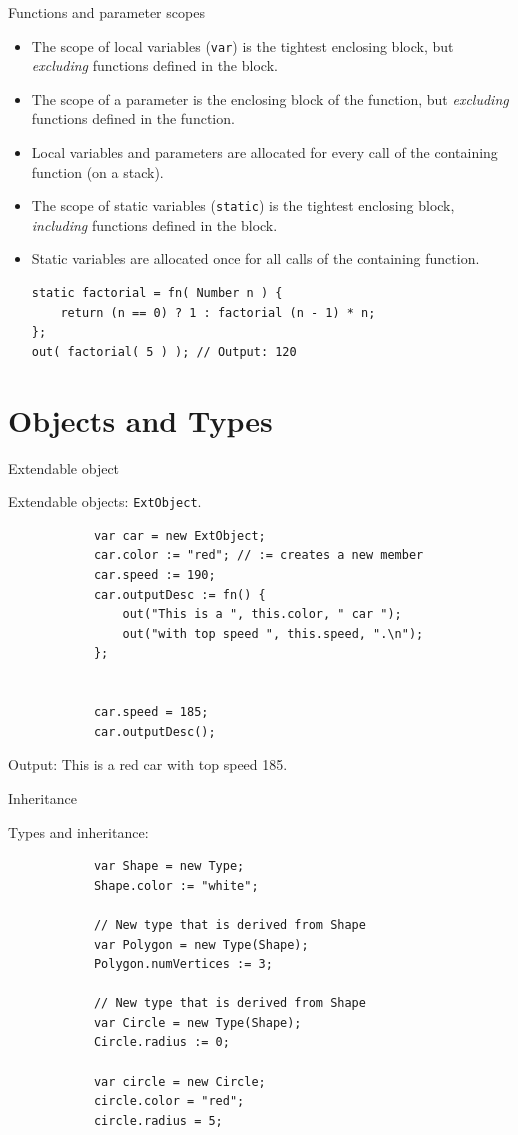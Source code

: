 \documentclass[ucs,9pt]{beamer}
\begin{document}
\begin{frame}[fragile]{Functions and parameter scopes}
	\begin{itemize}
	\item The scope of local variables (\lstinline!var!) is the tightest enclosing block, but \emph{excluding} functions defined in the block.
	\item The scope of a parameter is the enclosing block of the function, but \emph{excluding} functions defined in the function.
	\item Local variables and parameters are allocated for every call of the containing function (on a stack).
		\pause
	\item The scope of static variables (\lstinline!static!) is the tightest enclosing block, \emph{including} functions defined in the block.
	\item Static variables are allocated once for all calls of the containing function.
	\pause
			\begin{lstlisting}
static factorial = fn( Number n ) {
    return (n == 0) ? 1 : factorial (n - 1) * n;
};
out( factorial( 5 ) ); // Output: 120
		\end{lstlisting}
	\end{itemize}
		
	\end{frame}

\section{Objects and Types}
\begin{frame}[fragile]{Extendable object}
	\begin{block}{Extendable objects:  \lstinline!ExtObject!.}
		\begin{lstlisting}
			var car = new ExtObject;
			car.color := "red"; // := creates a new member
			car.speed := 190;
			car.outputDesc := fn() {
			    out("This is a ", this.color, " car ");
			    out("with top speed ", this.speed, ".\n");
			};


			car.speed = 185;
			car.outputDesc();
		\end{lstlisting}
	\end{block}
	Output: This is a red car with top speed 185.
\end{frame}

\begin{frame}[fragile]{Inheritance}
	\begin{block}{Types and inheritance:}
		\begin{lstlisting}
			var Shape = new Type;
			Shape.color := "white";

			// New type that is derived from Shape
			var Polygon = new Type(Shape); 
			Polygon.numVertices := 3;

			// New type that is derived from Shape
			var Circle = new Type(Shape); 
			Circle.radius := 0;

			var circle = new Circle;
			circle.color = "red";
			circle.radius = 5;
		\end{lstlisting}
	\end{block}
\end{frame}
 
\end{document}
